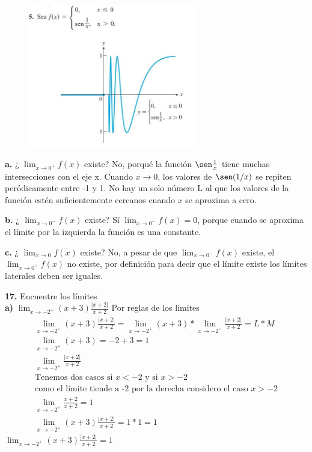 \documentclass[12pt, letterpaper]{article}
\begin{document}
\begin{figure}[tbh]
\centering
\includegraphics[width=20em]{t11dos}
\end{figure}


\textbf{a.} ¿  $\lim_{ x \to 0^+} f(x)$ existe? No, porqué la función $\sen \frac{1}{x}$ tiene muchas intersecciones con el eje x. Cuando $x \to 0$, los valores de $ \sen (1/x)$ se repiten peródicamente entre -1 y 1. No hay un solo número L al que los valores de la función estén suficientemente cercanos cuando $x$ se aproxima a cero.


\textbf{b.} ¿ $\lim_{ x \to 0^-} f(x)$ existe? Sí $\lim_{ x \to 0^-} f(x) = 0$, porque cuando se aproxima el límite por la izquierda la función es una constante.


\textbf{c.} ¿ $\lim_{ x \to 0} f(x)$ existe? No, a pesar de que $\lim_{ x \to 0^-} f(x)$ existe, el $\lim_{ x \to 0^+} f(x)$ no existe, por definición para decir que el límite existe los límites laterales deben ser iguales.

\newpage

\textbf{17.} Encuentre los límites \\

\textbf{a)} $\lim_{x \to -2^+} (x+3) \frac{|x+2|}{x+2}$ Por reglas de los limites 
\begin{align*}
	\lim_{x \to -2^+} (x+3) \frac{|x+2|}{x+2} = \lim_{x \to -2^+} (x+3) * \lim_{x \to -2^+} \frac{|x+2|}{x+2} = L * M\\
	\lim_{x \to -2^+} (x+3) = -2 +3 = 1  \\ 
	 \lim_{x \to -2^+} \frac{|x+2|}{x+2} \\
	\text{Tenemos dos casos si $x < -2$ y  si $x > -2$}\\
	\text{como  el límite tiende a -2 por la derecha considero el caso $x > -2$}\\
	\lim_{x \to -2^+} \frac{x+2}{x+2}= 1 \\
	\lim_{x \to -2^+} (x+3) \frac{|x+2|}{x+2} = 1 *1 = 1
\end{align*}
$\lim_{x \to -2^+} (x+3) \frac{|x+2|}{x+2}=1$ \\
\end{document}
